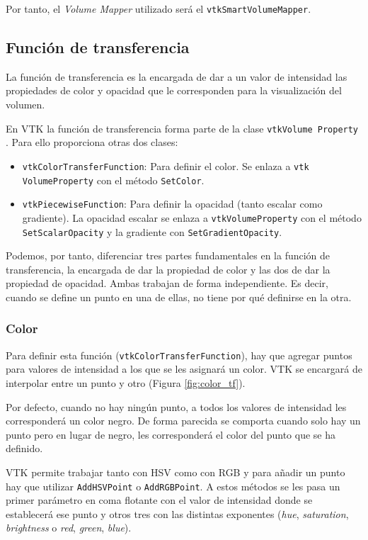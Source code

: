 Por tanto, el \textit{Volume Mapper} utilizado será el \texttt{vtkSmartVolumeMapper}.

\subsection{Función de transferencia}

La función de transferencia es la encargada de dar a un valor de intensidad las propiedades de color y opacidad que le corresponden para la visualización del volumen.

En VTK la función de transferencia forma parte de la clase \texttt{vtkVolume Property} \cite{vtk_example_medical4}. Para ello proporciona otras dos clases:

\begin{itemize}
	\item \texttt{vtkColorTransferFunction}: Para definir el color. Se enlaza a \texttt{vtk VolumeProperty} con el método \texttt{SetColor}.
	\item \texttt{vtkPiecewiseFunction}: Para definir la opacidad (tanto escalar como gradiente). La opacidad escalar se enlaza a \texttt{vtkVolumeProperty} con el método \texttt{SetScalarOpacity} y la gradiente con \texttt{SetGradientOpacity}.
\end{itemize}

Podemos, por tanto, diferenciar tres partes fundamentales en la función de transferencia, la encargada de dar la propiedad de color y las dos de dar la propiedad de opacidad. Ambas trabajan de forma independiente. Es decir, cuando se define un punto en una de ellas, no tiene por qué definirse en la otra.

\subsubsection{Color}

Para definir esta función (\texttt{vtkColorTransferFunction}), hay que agregar puntos para valores de intensidad a los que se les asignará un color. VTK se encargará de interpolar entre un punto y otro (Figura \ref{fig:color_tf}). 

Por defecto, cuando no hay ningún punto, a todos los valores de intensidad les corresponderá un color negro. De forma parecida se comporta cuando solo hay un punto pero en lugar de negro, les corresponderá el color del punto que se ha definido.

VTK permite trabajar tanto con HSV como con RGB y para añadir un punto hay que utilizar \texttt{AddHSVPoint} o \texttt{AddRGBPoint}. A estos métodos se les pasa un primer parámetro en coma flotante con el valor de intensidad donde se establecerá ese punto y otros tres con las distintas exponentes (\textit{hue}, \textit{saturation}, \textit{brightness} o \textit{red}, \textit{green}, \textit{blue}).

